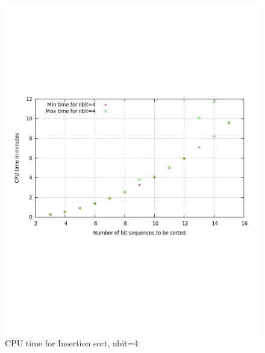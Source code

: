 \documentclass[12pt]{article}
\begin{document}
\begin{figure}%
\centering
\includegraphics[width=12cm]{fsort6.pdf} 
\caption{CPU time for Insertion sort, nbit=4} 
\label{fig:image_sf6} %
\end{figure}
\end{document}
